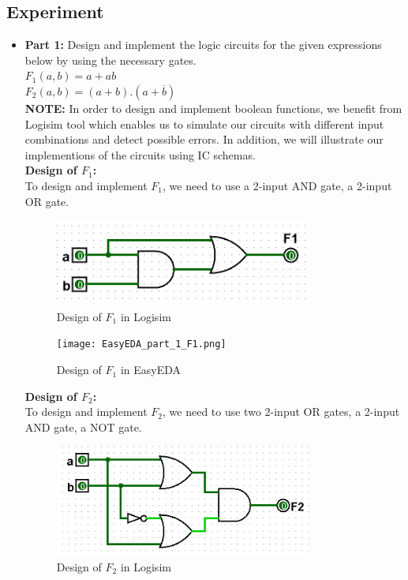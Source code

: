 \documentclass[pdftex,12pt,a4paper]{article}
\begin{document}
\subsection{Experiment}
\begin{itemize}
    \item \textbf{Part 1:} Design and implement the logic circuits for the given expressions below by using the necessary gates.\\
    $F_1 (a, b) = a + ab$ \\
    $F_2 (a, b) = (a + b) . (a + \overline{b})$\\

    \textbf{NOTE:} In order to design and implement boolean functions, we benefit from Logisim tool which enables us to simulate our circuits with different input combinations and detect possible errors. In addition, we will illustrate our implementions of the circuits using IC schemas.\\
    
    \textbf{Design of $F_1$:}\\
    To design and implement $F_1$, we need to use a 2-input AND gate, a 2-input OR gate.\\

    \begin{figure}[H]
    \centering
        \includegraphics[width=0.8\textwidth]{F1.png}	
        \caption{Design of \textbf{$F_1$} in Logisim}
   \end{figure}
   
   \begin{figure}[H]
    \centering
        \texttt{[image: EasyEDA\_part\_1\_F1.png]}	
        \caption{Design of \textbf{$F_1$} in EasyEDA}
   \end{figure}
   
   \textbf{Design of $F_2$:} \\ 
    To design and implement $F_2$, we need to use two 2-input OR gates, a 2-input AND gate, a NOT gate.\\

    \begin{figure}[H]
    \centering
        \includegraphics[width=0.8\textwidth]{F2.png}	
        \caption{Design of \textbf{$F_2$} in Logisim}
   \end{figure}
    

\end{itemize}
\end{document}
